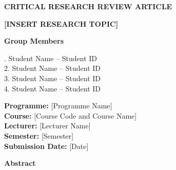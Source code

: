 \documentclass[12pt,a4paper]{article}
\begin{document}
\begin{center}

{\fontsize{18}{22}\selectfont\textbf{CRITICAL RESEARCH REVIEW ARTICLE}}

\vspace{0.5cm}

{\fontsize{18}{22}\selectfont\textbf{[INSERT RESEARCH TOPIC]}}

\vspace{1cm}

{\fontsize{12}{14}\selectfont\textbf{Group Members}}

\vspace{0.3cm}

{\fontsize{12}{14}. Student Name -- Student ID\\
2. Student Name -- Student ID\\
3. Student Name -- Student ID\\
4. Student Name -- Student ID
}

\vspace{0.8cm}

{\fontsize{12}{14}\selectfont
\textbf{Programme:} [Programme Name]\\
\textbf{Course:} [Course Code and Course Name]\\
\textbf{Lecturer:} [Lecturer Name]\\
\textbf{Semester:} [Semester]\\
\textbf{Submission Date:} [Date]
}

\end{center}



\vspace{0.5cm}

\noindent
\textbf{Abstract}

\vspace{0.2cm}
\end{document}
